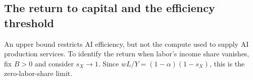 
\subsection{The return to capital and the efficiency threshold}
\label{subsec:rewrite-return-threshold}

An upper bound restricts AI efficiency, but not the compute used to supply AI production services. To identify the return when labor's income share vanishes, fix $B>0$ and consider $s_X\to1$. Since $wL/Y=(1-\alpha)(1-s_X)$, this is the zero-labor-share limit.

